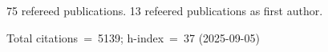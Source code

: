 75 refereed publications. 13 refeered publications as first author.

Total citations~=~5139; h-index~=~37 (2025-09-05)